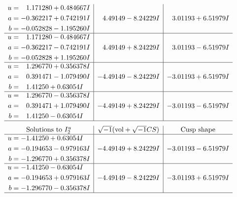 \documentclass[1p]{elsarticle_modified}
\theoremstyle{definition}
\newcommand{\I}{\sqrt{-1}}
\begin{document}
$$\begin{array}{c|c|c}
\begin{aligned}
u &= \phantom{-}1.171280 + 0.484667 I \\
a &= -0.362217 + 0.742191 I \\
b &= -0.052828 - 1.195260 I\end{aligned}
 & \phantom{-}4.49149 - 8.24229 I & \phantom{-}3.01193 + 6.51979 I \\ \hline\begin{aligned}
u &= \phantom{-}1.171280 - 0.484667 I \\
a &= -0.362217 - 0.742191 I \\
b &= -0.052828 + 1.195260 I\end{aligned}
 & \phantom{-}4.49149 + 8.24229 I & \phantom{-}3.01193 - 6.51979 I \\ \hline\begin{aligned}
u &= \phantom{-}1.296770 + 0.356378 I \\
a &= \phantom{-}0.391471 - 1.079490 I \\
b &= \phantom{-}1.41250 + 0.63054 I\end{aligned}
 & -4.49149 - 8.24229 I & -3.01193 + 6.51979 I \\ \hline\begin{aligned}
u &= \phantom{-}1.296770 - 0.356378 I \\
a &= \phantom{-}0.391471 + 1.079490 I \\
b &= \phantom{-}1.41250 - 0.63054 I\end{aligned}
 & -4.49149 + 8.24229 I & -3.01193 - 6.51979 I\\
 \hline 
 \end{array}$$\newpage$$\begin{array}{c|c|c}  
\text{Solutions to }I^u_{2}& \I (\text{vol} + \sqrt{-1}CS) & \text{Cusp shape}\\
 \hline 
\begin{aligned}
u &= -1.41250 + 0.63054 I \\
a &= -0.194653 - 0.979163 I \\
b &= -1.296770 + 0.356378 I\end{aligned}
 & -4.49149 + 8.24229 I & -3.01193 - 6.51979 I \\ \hline\begin{aligned}
u &= -1.41250 - 0.63054 I \\
a &= -0.194653 + 0.979163 I \\
b &= -1.296770 - 0.356378 I\end{aligned}
 & -4.49149 - 8.24229 I & -3.01193 + 6.51979 I\\
 \hline 
 \end{array}$$\newpage\newpage\renewcommand{\arraystretch}{1}
\end{document}
